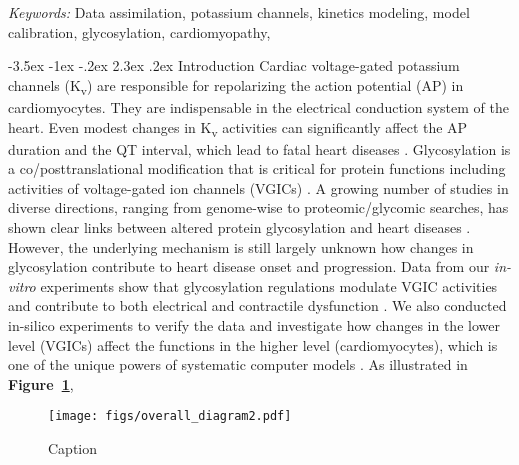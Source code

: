\documentclass[11pt]{article}
\makeatletter
\renewcommand\section{\@startsection {section}{1}{\z@}%
                                   {-3.5ex \@plus -1ex \@minus -.2ex}%
                                   {2.3ex \@plus.2ex}%
                                   {\normalfont\fontfamily{phv}\fontsize{16}{19}\bfseries}}
\makeatother
\begin{document}
\noindent%
{\it Keywords:} Data assimilation, potassium channels, kinetics modeling, model calibration, glycosylation, cardiomyopathy,

{} %

\section{Introduction} \label{s:intro}
Cardiac voltage-gated potassium channels (K\textsubscript{v}) are responsible for repolarizing the action potential (AP) in cardiomyocytes. They are indispensable in the electrical conduction system of the heart. Even modest changes in K\textsubscript{v} activities can significantly affect the AP duration and the QT interval, which lead to fatal heart diseases \citep{ravens2008role}. Glycosylation is a co/posttranslational modification that is critical for protein functions including activities of voltage-gated ion channels (VGICs) \citep{ohtsubo2006glycosylation,ednie2012modulation}. A growing number of studies in diverse directions, ranging from genome-wise to proteomic/glycomic searches, has shown clear links between altered protein glycosylation and heart diseases \citep{yung2004gene,yang2015glycoproteins,miura2016glycomics}. However, the underlying mechanism is still largely unknown how changes in glycosylation contribute to heart disease onset and progression. Data from our \textit{in-vitro} experiments show that glycosylation regulations modulate VGIC activities and contribute to both electrical and contractile dysfunction \citep{ednie2013sialicNav1,ednie2015sialicKv,ednie2019reduced}. We also conducted in-silico experiments to verify the data and investigate how changes in the lower level (VGICs) affect the functions in the higher level (cardiomyocytes), which is one of the unique powers of systematic computer models \citep{du2013silico,du2015statistical,du2017silico}. As illustrated in \textbf{Figure~\ref{fig:framework_diagram}}, 
\begin{figure}[!ht]
    \centering
    \texttt{[image: figs/overall\_diagram2.pdf]}
    \caption{Caption}
    \label{fig:framework_diagram}
\end{figure}
\end{document}
